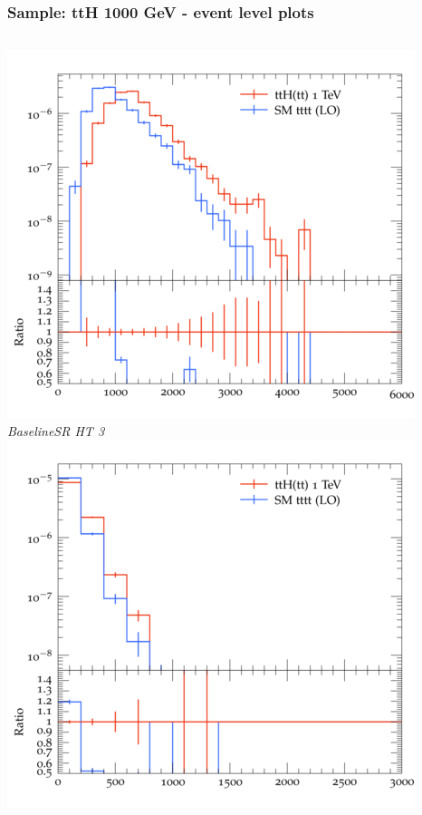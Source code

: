 \documentclass{beamer}
\begin{document}
\begin{frame}
\frametitle{Sample: ttH 1000 GeV - event level plots}
\begin{columns}
\includegraphics[width=\textwidth]{../plots/ttH_1000/tttt_ttH_1LOS/BaselineSR_HT_3.png}\\
\textit{\small BaselineSR HT 3}
\includegraphics[width=\textwidth]{../plots/ttH_1000/tttt_ttH_1LOS/BaselineSR_MET.png}\\

\end{columns}
\end{frame}
\end{document}
